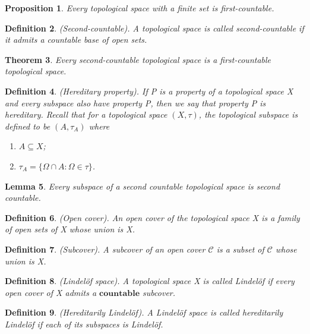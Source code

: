 \documentclass[twoside]{article}
\newcounter{lecnum}
\newtheorem{theorem}{Theorem}[lecnum]
\newtheorem{lemma}[theorem]{Lemma}
\newtheorem{proposition}[theorem]{Proposition}
\newtheorem{definition}[theorem]{Definition}
\begin{document}
\begin{proposition}Every topological space with a finite set is first-countable.
\end{proposition}

\begin{definition}(Second-countable). A topological space is called second-countable if it admits a countable base of open sets.
\end{definition}

\begin{theorem}Every second-countable topological space is a first-countable topological space.
\end{theorem}


\begin{definition}(Hereditary property). If P is a property of a topological space X and every subspace also have property P, then we say that property P is hereditary. Recall that for a topological space $(X, \tau)$, the topological subspace is defined to be $(A, \tau_A)$ where
\begin{enumerate}
\item $A \subseteq X$;
\item $\tau_A = \{\Omega \cap A: \Omega \in \tau\}$.
\end{enumerate}
\end{definition}

\begin{lemma} Every subspace of a second countable topological space is second countable.
\end{lemma}

\begin{definition}(Open cover). An open cover of the topological space X is a family of open sets of X whose union is X.
\end{definition}

\begin{definition}(Subcover). A subcover of an open cover $\mathcal{C}$ is a subset of $\mathcal{C}$ whose union is X.
\end{definition}

\begin{definition}(Lindelöf space). A topological space X is called Lindelöf if every open cover of X admits a $\textbf{countable}$ subcover.
\end{definition}

\begin{definition}(Hereditarily Lindelöf). A Lindelöf space is called hereditarily Lindelöf if each of its subspaces is Lindelöf.
\end{definition}
\end{document}
